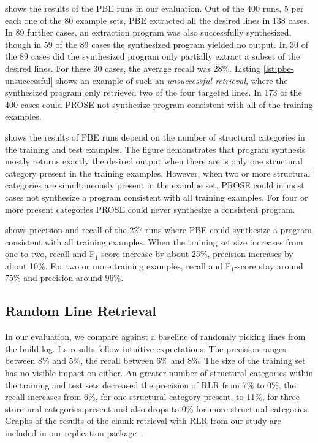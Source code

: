  shows the results of the PBE runs in our
evaluation.
Out of the 400 runs, 5 per each one of the 80 example
sets, PBE extracted all the desired lines in 138 cases.
In 89 further
cases, an extraction program was also successfully synthesized, though
in 59 of the 89 cases the synthesized program yielded no output.
In 30
of the 89 cases did the synthesized program only partially extract a
subset of the desired lines.
For these 30 cases, the average recall
was 28\%.
Listing \ref{lst:pbe-unsuccessful} shows an example of such
an \emph{unsuccessful retrieval}, where the synthesized program only
retrieved two of the four targeted lines.
In 173 of the 400 cases
could PROSE not synthesize program consistent with all of the training
examples.

 shows the results of PBE
runs depend on the number of structural categories in the training and
test examples.
The figure demonstrates that program synthesis mostly
returns exactly the desired output when there are is only one
structural category present in the training examples.
However, when
two or more structural categories are simultaneously present in the
examlpe set, PROSE could in most cases not synthesize a program
consistent with all training examples.
For four or more present
categories PROSE could never synthesize a consistent program.

 shows
precision and recall of the 227 runs where PBE could synthesize a
program consistent with all training examples.
When the training set
size increases from one to two, recall and F$_{1}$-score increase by
about 25\%, precision increases by about 10\%.
For two or more
training examples, recall and F$_{1}$-score stay around 75\% and
precision around 96\%.

\subsection{Random Line Retrieval}
\label{sec:r:rlr}

In our evaluation, we compare against a baseline of randomly
picking lines from the build log.
Its results follow intuitive
expectations:
The precision ranges between 8\% and 5\%, the recall between 6\% and
8\%.
The size of the training set has no visible impact on either.
An greater number of structural categories within the training and
test sets decreased the precision of RLR from 7\% to 0\%, the recall
increases from 6\%, for one structural category present, to 11\%, for
three sturctural categories present and also drops to 0\% for more
structural categories.
Graphs of the results of the chunk retrieval with RLR from our study
are included in our replication
package~\cite{brandt2020chunk-replication}.


